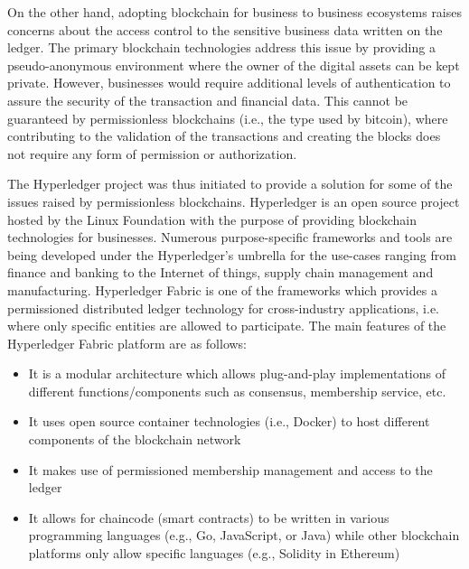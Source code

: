 \documentclass[conference]{IEEEtran}
\begin{document}
On the other hand, adopting blockchain for business to business ecosystems raises concerns about the access control to the sensitive business data written on the ledger. The primary blockchain technologies address this issue by providing a pseudo-anonymous environment where the owner of the digital assets can be kept private. However, businesses would require additional levels of authentication to assure the security of the transaction and financial data. 
This cannot be guaranteed by permissionless blockchains (i.e., the type used by bitcoin), where contributing to the validation of the transactions and creating the blocks does not require any form of permission or authorization.

The Hyperledger project was thus initiated to provide a solution for some of the issues raised by permissionless blockchains. Hyperledger is an open source project hosted by the Linux Foundation with the purpose of providing blockchain technologies for businesses. Numerous purpose-specific frameworks and tools are being developed under the Hyperledger's umbrella for the use-cases ranging from finance and banking to the Internet of things, supply chain management and manufacturing.
Hyperledger Fabric is one of the frameworks which provides a permissioned distributed ledger technology for cross-industry applications, i.e. where only specific entities are allowed to participate. The main features of the Hyperledger Fabric platform are as follows:

\begin{itemize}
    \item It is a modular architecture which allows plug-and-play implementations of different functions/components such as consensus, membership service, etc.
    \item It uses open source container technologies (i.e., Docker) to host different components of the blockchain network
    \item It makes use of permissioned membership management and access to the ledger
    \item It allows for chaincode (smart contracts) to be written in various programming languages (e.g., Go, JavaScript, or Java) while other blockchain platforms only allow specific languages (e.g., Solidity in Ethereum)
    
\end{itemize}
\end{document}
